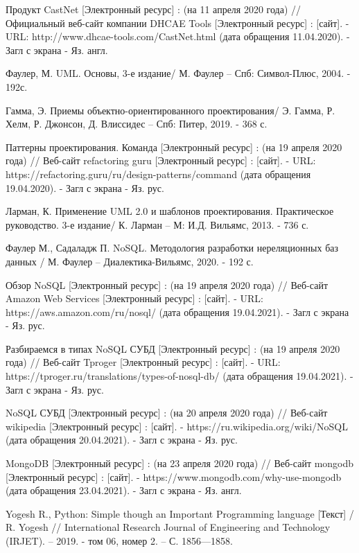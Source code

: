 \documentclass[14pt]{extreport}
\begin{document}
\begin{thebibliography}{9}
   Продукт CastNet [Электронный ресурс] : (на 11 апреля 2020 года) // Официальный веб-сайт компании DHCAE Tools [Электронный ресурс] : [сайт]. - URL: http://www.dhcae-tools.com/CastNet.html (дата обращения 11.04.2020). - Загл с экрана - Яз. англ.  

  Фаулер, М. UML. Основы, 3-е издание/ М. Фаулер -- Спб: Символ-Плюс, 2004. - 192с.
  
  Гамма, Э. Приемы объектно-ориентированного проектирования/ Э. Гамма, Р. Хелм, Р. Джонсон, Д. Влиссидес -- Спб: Питер, 2019. - 368 с.
  
  Паттерны проектирования. Команда [Электронный ресурс] : (на 19 апреля 2020 года) // Веб-сайт refactoring guru [Электронный ресурс] : [сайт]. - URL: https://refactoring.guru/ru/design-patterns/command (дата обращения 19.04.2020). - Загл с экрана - Яз. рус.
  
  Ларман, К. Применение UML 2.0 и шаблонов проектирования. Практическое руководство. 3-е издание/ К. Ларман -- М: И.Д. Вильямс, 2013. - 736 с.
  
     Фаулер М., Садаладж П. NoSQL. Методология разработки нереляционных баз данных / М. Фаулер -- Диалектика-Вильямс, 2020. - 192 с.
     
Обзор NoSQL [Электронный ресурс] : (на 19 апреля 2020 года) // Веб-сайт Amazon Web Services [Электронный ресурс] : [сайт]. - URL: https://aws.amazon.com/ru/nosql/ (дата обращения 19.04.2021). - Загл с экрана - Яз. рус.

Разбираемся в типах NoSQL СУБД [Электронный ресурс] : (на 19 апреля 2020 года) // Веб-сайт Tproger [Электронный ресурс] : [сайт]. - URL: https://tproger.ru/translations/types-of-nosql-db/ (дата обращения 19.04.2021). - Загл с экрана - Яз. рус.

NoSQL СУБД [Электронный ресурс] : (на 20 апреля 2020 года) // Веб-сайт wikipedia [Электронный ресурс] : [сайт]. - https://ru.wikipedia.org/wiki/NoSQL (дата обращения 20.04.2021). - Загл с экрана - Яз. рус.


MongoDB [Электронный ресурс] : (на 23 апреля 2020 года) // Веб-сайт mongodb [Электронный ресурс] : [сайт]. - https://www.mongodb.com/why-use-mongodb (дата обращения 23.04.2021). - Загл с экрана - Яз. англ.

Yogesh R., Python: Simple though an Important Programming language [Текст]  / R. Yogesh // International Research Journal of Engineering and Technology (IRJET). – 2019. - том 06, номер 2. – С. 1856—1858.


\end{thebibliography}
\end{document}
